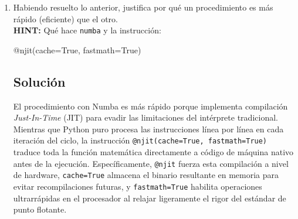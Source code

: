 \begin{enumerate}[label=\arabic*., leftmargin=*]
\begin{enumerate}[label=(\alph*), leftmargin=*]
\begin{itemize}[leftmargin=*]
            \item Durante la sección de evaluación de rendimiento (\textit{benchmark}), ambas funciones son ejecutadas enviándoles exactamente las mismas variables con los mismos parámetros numéricos.
        \end{itemize}

        \item Habiendo resuelto lo anterior, justifica por qué un procedimiento es más rápido (eficiente) que el otro. \\
        \textbf{HINT:} Qué hace \texttt{numba} y la instrucción:
        \begin{terminal}
            @njit(cache=True, fastmath=True)
        \end{terminal}
        \subsection*{Solución}
        El procedimiento con Numba es más rápido porque implementa compilación \textit{Just-In-Time} (JIT) para evadir las limitaciones del intérprete tradicional. Mientras que Python puro procesa las instrucciones línea por línea en cada iteración del ciclo, la instrucción \texttt{@njit(cache=True, fastmath=True)} traduce toda la función matemática directamente a código de máquina nativo antes de la ejecución. Específicamente, \texttt{@njit} fuerza esta compilación a nivel de hardware, \texttt{cache=True} almacena el binario resultante en memoria para evitar recompilaciones futuras, y \texttt{fastmath=True} habilita operaciones ultrarrápidas en el procesador al relajar ligeramente el rigor del estándar de punto flotante.
    \end{enumerate}
\end{enumerate}